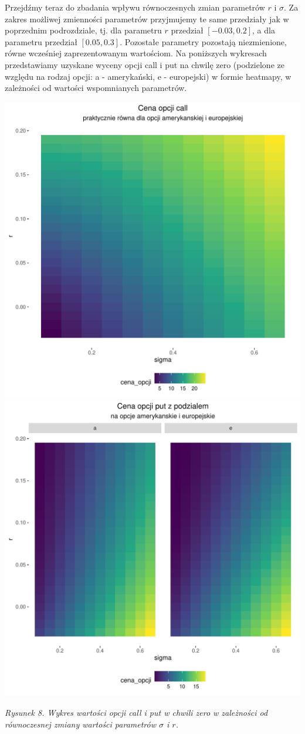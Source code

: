 \documentclass[
]{article}
\begin{document}
Przejdźmy teraz do zbadania wpływu równoczesnych zmian parametrów \(r\)
i \(\sigma\). Za zakres możliwej zmienności parametrów przyjmujemy te
same przedziały jak w poprzednim podrozdziale, tj. dla parametru \(r\)
przedział \([-0.03, 0.2]\), a dla parametru przedział \([0.05, 0.3]\).
Pozostałe parametry pozostają niezmienione, równe wcześniej
zaprezentowanym wartościom. Na poniższych wykresach przedstawiamy
uzyskane wyceny opcji call i put na chwilę zero (podzielone ze względu
na rodzaj opcji: a - amerykański, e - europejski) w formie heatmapy, w
zależności od wartości wspomnianych parametrów.

\begin{center}\includegraphics[width=0.45\linewidth]{wykresy/c_r_s_r_r} \includegraphics[width=0.45\linewidth]{wykresy/p_r_s_r_r} \end{center}

\emph{Rysunek 8. Wykres wartości opcji call i put w chwili zero w
zależności od równoczesnej zmiany wartości parametrów \(\sigma\) i
\(r\).}
\end{document}
